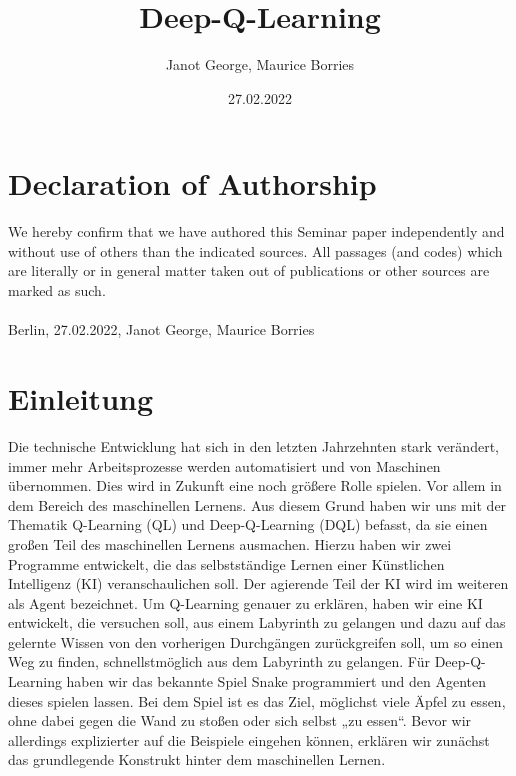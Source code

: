 \documentclass[12pt,titlepage]{article}
\begin{document}
\begin{titlepage}
\title{Deep-Q-Learning}
\date{27.02.2022}
\author{Janot George, Maurice Borries}
\maketitle
\end{titlepage}

\tableofcontents



\newpage
\section{Declaration of Authorship}
We hereby confirm that we have authored this Seminar paper independently and without use of others than the indicated sources. All passages (and codes) which are literally or in general matter taken out of publications or other sources are marked as such.
\\\\
Berlin, 27.02.2022, Janot George, Maurice Borries

\section{Einleitung}
Die technische Entwicklung hat sich in den letzten Jahrzehnten stark verändert, immer mehr Arbeitsprozesse werden automatisiert und von Maschinen übernommen. Dies wird in Zukunft eine noch größere Rolle spielen. Vor allem in dem Bereich des maschinellen Lernens. Aus diesem Grund haben wir uns mit der Thematik Q-Learning (QL) und Deep-Q-Learning (DQL) befasst, da sie einen großen Teil des maschinellen Lernens ausmachen. Hierzu haben wir zwei Programme entwickelt, die das selbstständige Lernen einer Künstlichen Intelligenz (KI) veranschaulichen soll. Der agierende Teil der KI wird im weiteren als Agent bezeichnet. Um Q-Learning genauer zu erklären, haben wir eine KI entwickelt, die versuchen soll, aus einem Labyrinth zu gelangen und dazu auf das gelernte Wissen von den vorherigen Durchgängen zurückgreifen soll, um so einen Weg zu finden, schnellstmöglich aus dem Labyrinth zu gelangen. Für Deep-Q-Learning haben wir das bekannte Spiel Snake programmiert und den Agenten dieses spielen lassen. Bei dem Spiel ist es das Ziel, möglichst viele Äpfel zu essen, ohne dabei gegen die Wand zu stoßen oder sich selbst „zu essen“. Bevor wir allerdings explizierter auf die Beispiele eingehen können, erklären wir zunächst das grundlegende Konstrukt hinter dem maschinellen Lernen.
\end{document}
